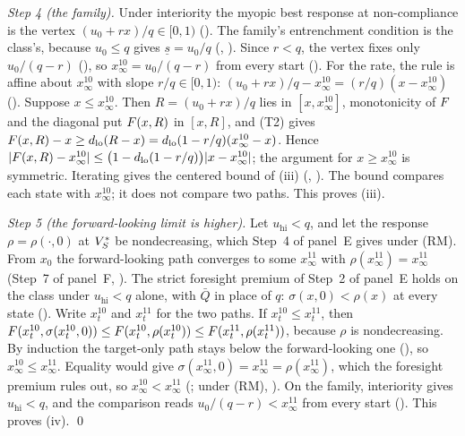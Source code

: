 \emph{Step 4 (the family).} Under interiority the myopic best response at non-compliance is
the vertex $(u_0+rx)/q\in[0,1)$ (). The family's
entrenchment condition is the class's, because $u_0\le q$ gives $\underline s=u_0/q$
(, ). Since $r<q$, the vertex
fixes only $u_0/(q-r)$ (), so $x^{10}_\infty=u_0/(q-r)$
from every start (). For the rate,
the rule is affine about $x^{10}_\infty$ with slope $r/q\in[0,1)$:
$(u_0+rx)/q-x^{10}_\infty=(r/q)(x-x^{10}_\infty)$ (). Suppose
$x\le x^{10}_\infty$. Then $R=(u_0+rx)/q$ lies in $[x,x^{10}_\infty]$, monotonicity of $F$
and the diagonal put $F(x,R)$ in $[x,R]$, and (T2) gives
$F(x,R)-x\ge d_{\mathrm{lo}}(R-x)=d_{\mathrm{lo}}(1-r/q)(x^{10}_\infty-x)$. Hence
$|F(x,R)-x^{10}_\infty|\le\bigl(1-d_{\mathrm{lo}}(1-r/q)\bigr)|x-x^{10}_\infty|$; the argument for
$x\ge x^{10}_\infty$ is symmetric. Iterating gives the centered bound of (iii)
(,
). The bound compares each state with
$x^{10}_\infty$; it does not compare two paths. This proves (iii).

\emph{Step 5 (the forward-looking limit is higher).} Let $u_{\mathrm{hi}}<q$, and
let the response $\rho=\rho(\cdot,0)$ at $V_S^\ast$ be nondecreasing, which
Step~4 of panel~E gives under (RM). From $x_0$ the forward-looking path
converges to some $x^{11}_\infty$ with $\rho(x^{11}_\infty)=x^{11}_\infty$ (Step~7 of panel~F,
). The strict foresight premium of Step~2 of
panel~E holds on the class under $u_{\mathrm{hi}}<q$ alone, with $\bar Q$ in
place of $q$: $\sigma(x,0)<\rho(x)$ at every state ().
Write $x^{10}_t$ and $x^{11}_t$ for the two paths. If $x^{10}_t\le x^{11}_t$,
then
$F(x^{10}_t,\sigma(x^{10}_t,0))\le F(x^{10}_t,\rho(x^{10}_t))\le F(x^{11}_t,\rho(x^{11}_t))$,
because $\rho$ is nondecreasing. By induction the target-only path stays below
the forward-looking one (), so
$x^{10}_\infty\le x^{11}_\infty$. Equality would give $\sigma(x^{11}_\infty,0)=x^{11}_\infty=\rho(x^{11}_\infty)$, which the foresight premium
rules out, so $x^{10}_\infty<x^{11}_\infty$
(; under (RM),
). On the family, interiority gives
$u_{\mathrm{hi}}<q$, and the comparison reads $u_0/(q-r)<x^{11}_\infty$ from every start
(). This proves (iv). \qed

